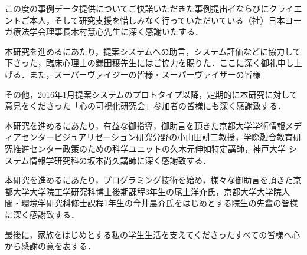 \documentclass[shuuron]{kuee}
\begin{document}
\begin{acknowledgements}
  この度の事例データ提供についてご快諾いただきた事例提出者ならびにクライエントご本人，そして研究支援を惜しみなく行っていただいている（社）日本ヨーガ療法学会理事長木村慧心先生に深く感謝いたする．

  本研究を進めるにあたり，提案システムへの助言，システム評価などに協力して下さった，臨床心理士の鎌田穣先生にはご協力を賜りた．ここに深く御礼申し上げる．また，スーパーヴァイジーの皆様・スーパーヴァイザーの皆様

  その他，2016年1月提案システムのプロトタイプ以降，定期的に本研究に対して意見をくださった「心の可視化研究会」参加者の皆様にも深く感謝致する．

  本研究を進めるにあたり，有益な御指導，御助言を頂きた京都大学学術情報メディアセンタービジュアリゼーション研究分野の小山田耕二教授，学際融合教育研究推進センター政策のための科学ユニットの久木元伸如特定講師，神戸大学 システム情報学研究科の坂本尚久講師に深く感謝致する．



  本研究を進めるにあたり，プログラミング技術を始め，様々な御助言を頂きた京都大学大学院工学研究科博士後期課程3年生の尾上洋介氏，京都大学大学院人間・環境学研究科修士課程1年生の今井晨介氏をはじめとする院生の先輩の皆様に深く感謝致する．

  最後に，家族をはじめとする私の学生生活を支えてくださったすべての皆様へ心から感謝の意を表する．
\end{acknowledgements}





\end{document}
